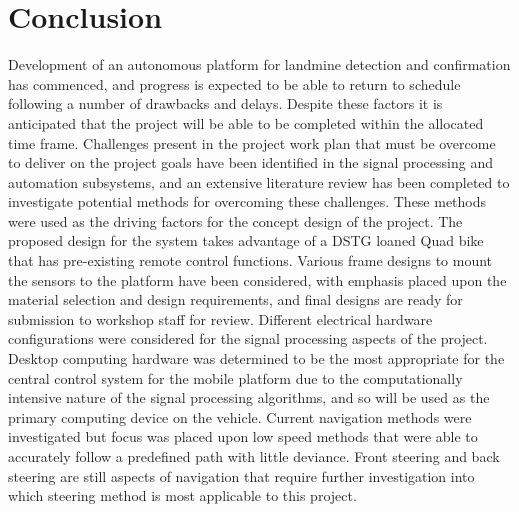 \documentclass[main.tex]{subfiles}
\begin{document}
\section{Conclusion}
Development of an autonomous platform for landmine detection and confirmation has commenced, and progress is expected to be able to return to schedule following a number of drawbacks and delays. 
Despite these factors it is anticipated that the project will be able to be completed within the allocated time frame. 
Challenges present in the project work plan that must be overcome to deliver on the project goals have been identified in the signal processing and automation subsystems, and an extensive literature review has been completed to investigate potential methods for overcoming these challenges. 
These methods were used as the driving factors for the concept design of the project. 
The proposed design for the system takes advantage of a DSTG loaned Quad bike that has pre-existing remote control functions. 
Various frame designs to mount the sensors to the platform have been considered, with emphasis placed upon the material selection and design requirements, and final designs are ready for submission to workshop staff for review.
Different electrical hardware configurations were considered for the signal processing aspects of the project.
Desktop computing hardware was determined to be the most appropriate for the central control system for the mobile platform due to the computationally intensive nature of the signal processing algorithms, and so will be used as the primary computing device on the vehicle.
Current navigation methods were investigated but focus was placed upon low speed methods that were able to accurately follow a predefined path with little deviance. 
Front steering and back steering are still aspects of navigation that require further investigation into which steering method is most applicable to this project. 







\end{document}
